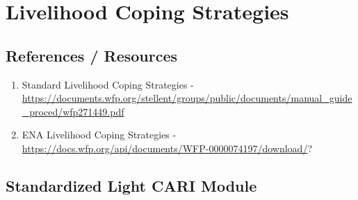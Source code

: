 \documentclass[
]{book}
\begin{document}
\hypertarget{livelihood-coping-strategies}{%
\chapter{Livelihood Coping Strategies}\label{livelihood-coping-strategies}}

\hypertarget{references-resources-3}{%
\section{References / Resources}\label{references-resources-3}}

\begin{enumerate}
\def\labelenumi{\arabic{enumi}.}
\item
  Standard Livelihood Coping Strategies - \url{https://documents.wfp.org/stellent/groups/public/documents/manual_guide_proced/wfp271449.pdf}
\item
  ENA Livelihood Coping Strategies - \url{https://docs.wfp.org/api/documents/WFP-0000074197/download/}?
\end{enumerate}

\hypertarget{standardized-light-cari-module}{%
\section{Standardized Light CARI Module}\label{standardized-light-cari-module}}
\end{document}
